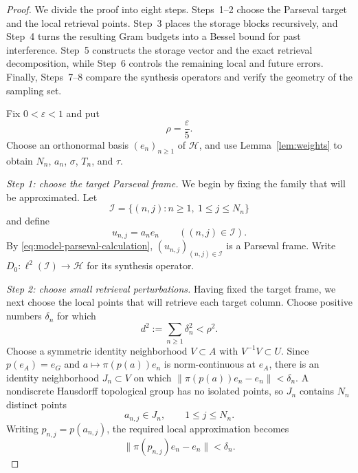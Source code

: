\documentclass[reqno]{amsart}
\numberwithin{equation}{section}
\theoremstyle{definition}
\theoremstyle{remark}
\newcommand{\cH}{\mathcal H}
\newcommand{\cI}{\mathcal I}
\newcommand{\Step}[1]{\par\medskip\noindent\textit{#1.}\quad}
\begin{document}
\begin{proof}
We divide the proof into eight steps.  Steps~1--2 choose the Parseval target
and the local retrieval points.  Step~3 places the storage blocks recursively,
and Step~4 turns the resulting Gram budgets into a Bessel bound for past
interference.  Step~5 constructs the storage vector and the exact retrieval
decomposition, while Step~6 controls the remaining local and future errors.
Finally, Steps~7--8 compare the synthesis operators and verify the geometry
of the sampling set.

Fix $0<\varepsilon<1$ and put
\begin{equation}\label{eq:rho-choice}
   \rho=\frac{\varepsilon}{5}.
\end{equation}
Choose an orthonormal basis $(e_n)_{n\geq1}$ of $\cH$, and use
Lemma~\ref{lem:weights} to obtain $N_n$, $a_n$, $\sigma$, $T_n$, and $\tau$.

\Step{Step 1: choose the target Parseval frame}
We begin by fixing the family that will be approximated.  Let
\[
 \cI=\{(n,j):n\geq1,\ 1\leq j\leq N_n\}
\]
and define
\begin{equation}\label{eq:target-parseval}
 u_{n,j}=a_ne_n\qquad((n,j)\in\cI).
\end{equation}
By \eqref{eq:model-parseval-calculation}, $(u_{n,j})_{(n,j)\in\cI}$ is a
Parseval frame.  Write $D_0:\ell^2(\cI)\to\cH$ for its synthesis operator.

\Step{Step 2: choose small retrieval perturbations}
Having fixed the target frame, we next choose the local points that will
retrieve each target column.  Choose positive numbers $\delta_n$ for which
\begin{equation}\label{eq:d-definition}
 d^2:=\sum_{n\geq1}\delta_n^2<\rho^2.
\end{equation}
Choose a symmetric identity neighborhood $V\subset A$ with
$V^{-1}V\subset U$.  Since $p(e_A)=e_G$ and $a\mapsto\pi(p(a))e_n$ is
norm-continuous at $e_A$, there is an identity neighborhood $J_n\subset V$
on which $\|\pi(p(a))e_n-e_n\|<\delta_n$.  A nondiscrete Hausdorff
topological group has no isolated points, so $J_n$ contains $N_n$ distinct
points
\begin{equation}\label{eq:retrieval-points}
 a_{n,j}\in J_n,\qquad 1\leq j\leq N_n.
\end{equation}
Writing $p_{n,j}=p(a_{n,j})$, the required local approximation becomes
\begin{equation}\label{eq:retrieval-small}
 \|\pi(p_{n,j})e_n-e_n\|<\delta_n.
\end{equation}


\end{proof}
\end{document}
